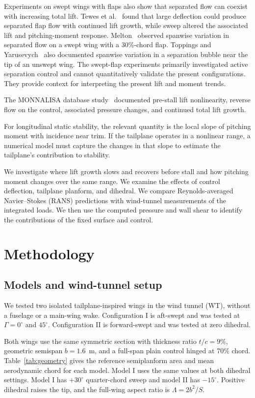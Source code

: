\documentclass[journal]{new-aiaa}
\newcommand{\degc}{^\circ}
\begin{document}
Experiments on swept wings with flaps also show that separated flow can coexist with increasing total lift. Tewes et al.~\cite{tewes2014sweepcontrol} found that large deflection could produce separated flap flow with continued lift growth, while sweep altered the associated lift and pitching-moment response. Melton~\cite{melton2014sweptflap} observed spanwise variation in separated flow on a swept wing with a 30\%-chord flap. Toppings and Yarusevych~\cite{toppings2021wingtip} also documented spanwise variation in a separation bubble near the tip of an unswept wing. The swept-flap experiments primarily investigated active separation control and cannot quantitatively validate the present configurations. They provide context for interpreting the present lift and moment trends.

The MONNALISA database study~\cite{rausa2026monnalisa} documented pre-stall lift nonlinearity, reverse flow on the control, associated pressure changes, and continued total lift growth.

For longitudinal static stability, the relevant quantity is the local slope of pitching moment with incidence near trim. If the tailplane operates in a nonlinear range, a numerical model must capture the changes in that slope to estimate the tailplane's contribution to stability.

We investigate where lift growth slows and recovers before stall and how pitching moment changes over the same range. We examine the effects of control deflection, tailplane planform, and dihedral. We compare Reynolds-averaged Navier--Stokes (RANS) predictions with wind-tunnel measurements of the integrated loads. We then use the computed pressure and wall shear to identify the contributions of the fixed surface and control.

\label{end:sec:intro}
\section{Methodology}\label{sec:methods}
\subsection{Models and wind-tunnel setup}\label{sec:setup}
We tested two isolated tailplane-inspired wings in the wind tunnel (WT), without a fuselage or a main-wing wake. Configuration I is aft-swept and was tested at $\Gamma=0\degc$ and $45\degc$. Configuration II is forward-swept and was tested at zero dihedral.

Both wings use the same symmetric section with thickness ratio $t/c=9\%$, geometric semispan $b=1.6$~m, and a full-span plain control hinged at 70\% chord. Table~\ref{tab:geometry} gives the reference semiplanform area and mean aerodynamic chord for each model. Model I uses the same values at both dihedral settings. Model I has $+30\degc$ quarter-chord sweep and model II has $-15\degc$. Positive dihedral raises the tip, and the full-wing aspect ratio is $\Lambda=2b^2/S$.
\end{document}
